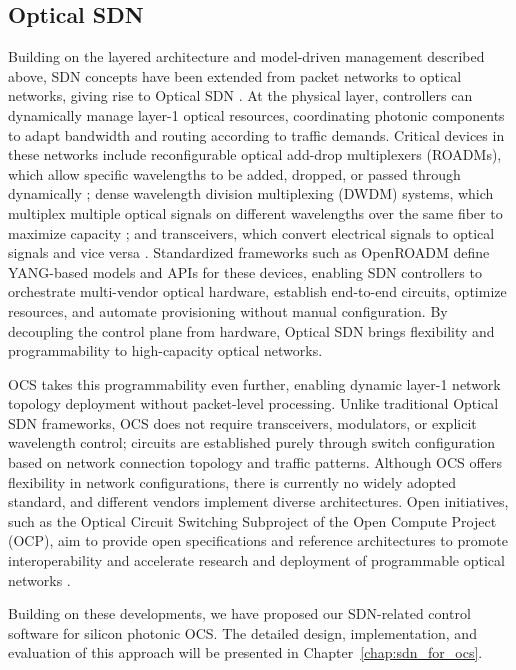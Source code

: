 \subsection{Optical SDN}\label{sub:optical_sdn}
Building on the layered architecture and model-driven management described above, SDN concepts have been extended from packet networks to optical networks, giving rise to Optical SDN \cite{7503119}.
At the physical layer, controllers can dynamically manage layer-1 optical resources, coordinating photonic components to adapt bandwidth and routing according to traffic demands.
Critical devices in these networks include reconfigurable optical add-drop multiplexers (ROADMs), which allow specific wavelengths to be added, dropped, or passed through dynamically \cite{casellas2019sdn};
dense wavelength division multiplexing (DWDM) systems, which multiplex multiple optical signals on different wavelengths over the same fiber to maximize capacity \cite{amaya2014software};
and transceivers, which convert electrical signals to optical signals and vice versa \cite{munoz2019sdn}.
Standardized frameworks such as OpenROADM define YANG-based models and APIs for these devices, enabling SDN controllers to orchestrate multi-vendor optical hardware, establish end-to-end circuits, optimize resources, and automate provisioning without manual configuration.
By decoupling the control plane from hardware, Optical SDN brings flexibility and programmability to high-capacity optical networks.

OCS takes this programmability even further, enabling dynamic layer-1 network topology deployment without packet-level processing.
Unlike traditional Optical SDN frameworks, OCS does not require transceivers, modulators, or explicit wavelength control; circuits are established purely through switch configuration based on network connection topology and traffic patterns.
Although OCS offers flexibility in network configurations, there is currently no widely adopted standard, and different vendors implement diverse architectures.
Open initiatives, such as the Optical Circuit Switching Subproject of the Open Compute Project (OCP), aim to provide open specifications and reference architectures to promote interoperability and accelerate research and deployment of programmable optical networks \cite{opencompute_optical_circuit_switching}.

Building on these developments, we have proposed our SDN-related control software for silicon photonic OCS.
The detailed design, implementation, and evaluation of this approach will be presented in Chapter~\ref{chap:sdn_for_ocs}.

